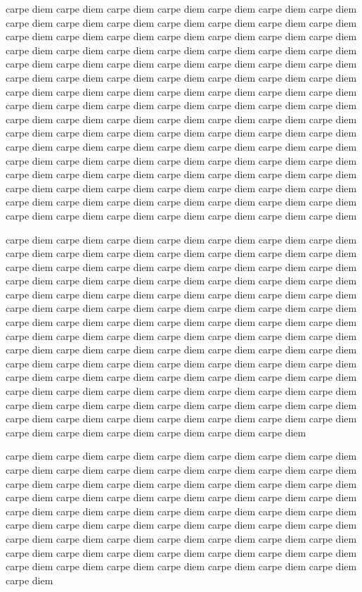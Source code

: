 carpe diem carpe diem carpe diem carpe diem carpe diem carpe diem carpe diem carpe diem 
carpe diem carpe diem carpe diem carpe diem carpe diem carpe diem carpe diem carpe diem 
carpe diem carpe diem carpe diem carpe diem carpe diem carpe diem carpe diem carpe diem 
carpe diem carpe diem carpe diem carpe diem carpe diem carpe diem carpe diem carpe diem 
carpe diem carpe diem carpe diem carpe diem carpe diem carpe diem carpe diem carpe diem 
carpe diem carpe diem carpe diem carpe diem carpe diem carpe diem carpe diem carpe diem 
carpe diem carpe diem carpe diem carpe diem carpe diem carpe diem carpe diem carpe diem 
carpe diem carpe diem carpe diem carpe diem carpe diem carpe diem carpe diem carpe diem 
carpe diem carpe diem carpe diem carpe diem carpe diem carpe diem carpe diem carpe diem 
carpe diem carpe diem carpe diem carpe diem carpe diem carpe diem carpe diem carpe diem 
carpe diem carpe diem carpe diem carpe diem carpe diem carpe diem carpe diem carpe diem 
carpe diem carpe diem carpe diem carpe diem carpe diem carpe diem carpe diem carpe diem 
carpe diem carpe diem carpe diem carpe diem carpe diem carpe diem carpe diem carpe diem 
carpe diem carpe diem carpe diem carpe diem carpe diem carpe diem carpe diem carpe diem 


carpe diem carpe diem carpe diem carpe diem carpe diem carpe diem carpe diem carpe diem 
carpe diem carpe diem carpe diem carpe diem carpe diem carpe diem carpe diem carpe diem 
carpe diem carpe diem carpe diem carpe diem carpe diem carpe diem carpe diem carpe diem 
carpe diem carpe diem carpe diem carpe diem carpe diem carpe diem carpe diem carpe diem 
carpe diem carpe diem carpe diem carpe diem carpe diem carpe diem carpe diem carpe diem 
carpe diem carpe diem carpe diem carpe diem carpe diem carpe diem carpe diem carpe diem 
carpe diem carpe diem carpe diem carpe diem carpe diem carpe diem carpe diem carpe diem 
carpe diem carpe diem carpe diem carpe diem carpe diem carpe diem carpe diem carpe diem 
carpe diem carpe diem carpe diem carpe diem carpe diem carpe diem carpe diem carpe diem 
carpe diem carpe diem carpe diem carpe diem carpe diem carpe diem carpe diem carpe diem 
carpe diem carpe diem carpe diem carpe diem carpe diem carpe diem carpe diem carpe diem 
carpe diem carpe diem carpe diem carpe diem carpe diem carpe diem carpe diem carpe diem 
carpe diem carpe diem carpe diem carpe diem carpe diem carpe diem carpe diem carpe diem 


carpe diem carpe diem carpe diem carpe diem carpe diem carpe diem carpe diem carpe diem 
carpe diem carpe diem carpe diem carpe diem carpe diem carpe diem carpe diem carpe diem 
carpe diem carpe diem carpe diem carpe diem carpe diem carpe diem carpe diem carpe diem 
carpe diem carpe diem carpe diem carpe diem carpe diem carpe diem carpe diem carpe diem 
carpe diem carpe diem carpe diem carpe diem carpe diem carpe diem carpe diem carpe diem 
carpe diem carpe diem carpe diem carpe diem carpe diem carpe diem carpe diem carpe diem 
carpe diem carpe diem carpe diem carpe diem carpe diem carpe diem carpe diem carpe diem 
carpe diem carpe diem carpe diem carpe diem carpe diem carpe diem carpe diem carpe diem 
